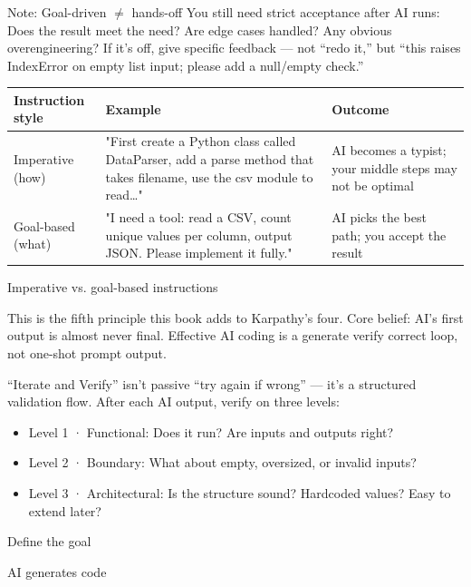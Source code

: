 \begin{tcbwarn}{Note: Goal-driven $\neq$ hands-off}
You still need strict acceptance after AI runs: Does the result meet the need? Are edge cases handled? Any obvious overengineering? If it's off, give specific feedback — not “redo it,” but “this raises IndexError on empty list input; please add a null/empty check.”

\end{tcbwarn}

\begin{center}
\begin{tabularx}{\linewidth}{|X|X|X|}
\hline
\textbf{Instruction style} & \textbf{Example} & \textbf{Outcome} \tabularnewline
\hline
Imperative (how) & "First create a Python class called DataParser, add a parse method that takes filename, use the csv module to read…" & AI becomes a typist; your middle steps may not be optimal \tabularnewline
Goal-based (what) & "I need a tool: read a CSV, count unique values per column, output JSON. Please implement it fully." & AI picks the best path; you accept the result \tabularnewline
\hline
\end{tabularx}
\end{center}

\begin{center}\small\color{gray}Imperative vs. goal-based instructions\end{center}


This is the fifth principle this book adds to Karpathy's four. Core belief: AI's first output is almost never final. Effective AI coding is a generate verify correct loop, not one-shot prompt output.

“Iterate and Verify” isn't passive “try again if wrong” — it's a structured validation flow. After each AI output, verify on three levels:

\begin{itemize}
  \item Level 1 · Functional: Does it run? Are inputs and outputs right?
  \item Level 2 · Boundary: What about empty, oversized, or invalid inputs?
  \item Level 3 · Architectural: Is the structure sound? Hardcoded values? Easy to extend later?
\end{itemize}

Define the goal

AI generates code

